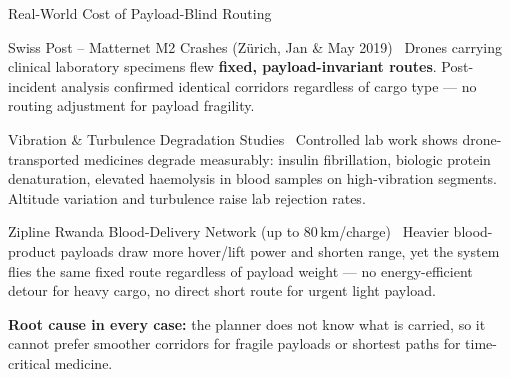 \documentclass[aspectratio=169,11pt]{beamer}
\begin{document}
\begin{frame}{Real-World Cost of Payload-Blind Routing}
  \begin{block}{Swiss Post -- Matternet M2 Crashes (Z\"{u}rich, Jan \& May 2019)~\cite{r12}}
    \footnotesize Drones carrying clinical laboratory specimens flew \textbf{fixed, payload-invariant
    routes}. Post-incident analysis confirmed identical corridors regardless of cargo type ---
    no routing adjustment for payload fragility.
  \end{block}
  \vspace{0.05cm}
  \begin{block}{Vibration \& Turbulence Degradation Studies~\cite{r13,r14,r15}}
    \footnotesize Controlled lab work shows drone-transported medicines degrade measurably:
    insulin fibrillation, biologic protein denaturation, elevated haemolysis in blood samples
    on high-vibration segments.  Altitude variation and turbulence raise lab rejection rates.
  \end{block}
  \vspace{0.05cm}
  \begin{block}{Zipline Rwanda Blood-Delivery Network (up to 80\,km/charge)~\cite{r16}}
    \footnotesize Heavier blood-product payloads draw more hover/lift power and shorten range,
    yet the system flies the same fixed route regardless of payload weight ---
    no energy-efficient detour for heavy cargo, no direct short route for urgent light payload.
  \end{block}
  \vspace{0.04cm}
  \centering\footnotesize\textbf{Root cause in every case:} the planner does not know what is
  carried, so it cannot prefer smoother corridors for fragile payloads or shortest paths for
  time-critical medicine.
\end{frame}
\end{document}

